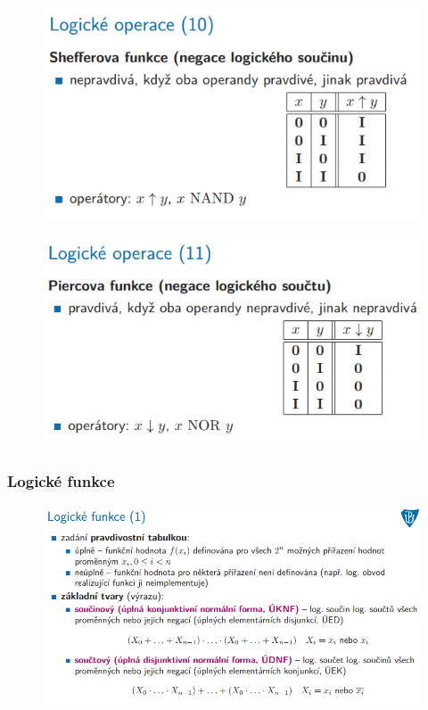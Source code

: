 \documentclass[10pt,a4paper]{article}
\begin{document}
\begin{figure} [h]
	\includegraphics[scale=0.65]{img/prvni_odstavec/otazka2/logicke_operace13.png}	
\end{figure}

\begin{figure} [h]
	\includegraphics[scale=0.65]{img/prvni_odstavec/otazka2/logicke_operace14.png}	
\end{figure}

\clearpage
\subsubsection{Logické funkce}
\begin{figure} [h]
	\includegraphics[scale=0.65]{img/prvni_odstavec/otazka2/logicke_funkce1.png}	
\end{figure}
\end{document}
